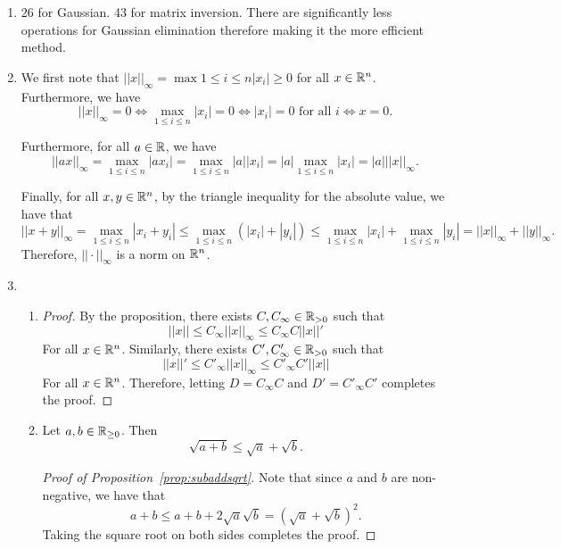\documentclass[12pt]{article}
\begin{document}
\begin{enumerate}[leftmargin=2em]
    \item 
    26 for Gaussian. 43 for matrix inversion. There are significantly less operations for Gaussian elimination therefore making it the more efficient method.
    \item 
    We first note that $||x||_{\infty} = \max{1\leq i\leq n} |x_i| \geq  0$ for all $x\in \mathbb{R}^n$. Furthermore, we have
    \[||x||_{\infty} = 0 \iff \max_{1\leq i \leq n} |x_i| = 0 \iff |x_i| = 0\text{  for all }i \iff x=0.\]

    \smallskip

    \noindent Furthermore, for all $a\in \mathbb{R}$, we have
    \[||ax||_{\infty} = \max_{1\leq i\leq n} |ax_i| = \max_{1\leq i\leq n} |a||x_i| = |a|\max_{1\leq i\leq n} |x_i| = |a|||x||_{\infty}.\]

    \smallskip 

    \noindent Finally, for all $x,y\in \mathbb{R}^n$, by the triangle inequality for the absolute value, we have that
    \[||x+y||_{\infty} = \max_{1\leq i \leq n} |x_i+y_i| \leq \max_{1\leq i\leq n} (|x_i|+|y_i|) \leq \max_{1\leq i\leq n} |x_i| +\max_{1\leq i\leq n} |y_i| = ||x||_{\infty} + ||y||_{\infty}.\]
    Therefore, $||\cdot||_{\infty}$ is a norm on $\mathbb{R}^n$.

    \item
    \begin{enumerate}[leftmargin=!]
        \item 
        \begin{proof}
            By the proposition, there exists $C, C_{\infty}\in \mathbb{R}_{>0}$ such that
            \[||x||\leq C_{\infty} ||x||_{\infty}\leq C_{\infty} C ||x||'\]
            For all $x\in \mathbb{R}^{n}$. Similarly, there exists $C',C'_{\infty}\in \mathbb{R}_{>0}$ such that 
            \[||x||' \leq C'_{\infty} ||x||_{\infty} \leq C'_{\infty} C' ||x||\]
            For all $x\in \mathbb{R}^n$. Therefore, letting $D=C_{\infty}C$ and $D'=  C'_{\infty} C'$ completes the proof.
        \end{proof}
        \item 
        \begin{proposition}\label{prop:subaddsqrt}
            Let $a,b\in \mathbb{R}_{\geq 0}$. Then
            \[\sqrt{a+b} \leq \sqrt{a}+\sqrt{b}.\]
        \end{proposition}
        \begin{proof}[Proof of Proposition~\ref{prop:subaddsqrt}]
            Note that since $a$ and $b$ are non-negative, we have that
            \[a+b \leq a+b+2\sqrt{a}\sqrt{b} = {(\sqrt{a}+\sqrt{b})}^2.\]
            Taking the square root on both sides completes the proof.
        \end{proof}


\end{enumerate}
\end{enumerate}
\end{document}
